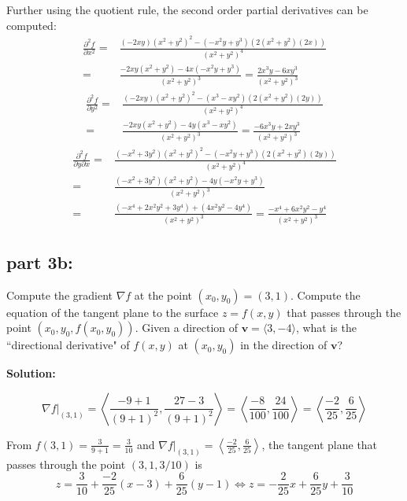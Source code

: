 \documentclass{article}
\newcommand{\at}[1]{\left. #1 \right|}
\newcommand{\dr}[1]{\textcolor{dark_red}{#1}}
\begin{document}
\dr{Further using the quotient rule, the second order partial derivatives can be computed:
\begin{align*}
\frac{\partial^2 f}{\partial x^2} = & \frac{(-2xy)(x^2 + y^2)^2 - (-x^2y + y^3)(2(x^2 + y^2)(2x))}{(x^2 + y^2)^4} \\
= & \frac{-2xy(x^2 + y^2) - 4x(-x^2y + y^3)}{(x^2 + y^2)^3}    
= \frac{2x^3y - 6xy^3}{(x^2 + y^2)^3}
\end{align*}
\begin{align*}
\frac{\partial^2 f}{\partial y^2} = & \frac{(-2xy)(x^2 + y^2)^2 - (x^3 - xy^2)(2(x^2 + y^2)(2y))}{(x^2 + y^2)^4} \\
= & \frac{-2xy(x^2 + y^2) - 4y(x^3 - xy^2)}{(x^2 + y^2)^3} 
= \frac{-6x^3y + 2xy^3}{(x^2 + y^2)^3}
\end{align*}
\begin{align*}
\frac{\partial^2 f}{\partial y \partial x} = & \frac{(-x^2 + 3y^2)(x^2 + y^2)^2 - (-x^2y + y^3)(2(x^2 + y^2)(2y))}{(x^2 + y^2)^4} \\
= & \frac{(-x^2 + 3y^2)(x^2 + y^2) - 4y(-x^2y + y^3)}{(x^2 + y^2)^3} \\
= & \frac{(-x^4 + 2x^2y^2 + 3y^4) + (4x^2y^2 - 4y^4)}{(x^2 + y^2)^3} 
= \frac{-x^4 + 6x^2y^2 - y^4}{(x^2 + y^2)^3}
\end{align*}
}

\subsection*{part 3b:}

Compute the gradient \(\nabla f\) at the point \((x_0,y_0) = (3,1)\). Compute the equation of the tangent plane to the surface \(z = f(x,y)\) that passes through the point \((x_0,y_0,f(x_0,y_0))\). Given a direction of \(\mathbf{v} = \langle 3, -4 \rangle\), what is the ``directional derivative" of \(f(x,y)\) at \((x_0, y_0)\) in the direction of \(\mathbf{v}\)?

\vspace{0.5cm}

\dr{\bf Solution:}

\vspace{0.5cm}

\dr{\[\at{\nabla f}_{(3,1)} = \left\langle \frac{-9 + 1}{(9 + 1)^2} , \frac{27 - 3}{(9 + 1)^2} \right\rangle = \left\langle \frac{-8}{100} , \frac{24}{100} \right\rangle = \left\langle \frac{-2}{25} , \frac{6}{25} \right\rangle\]}

\dr{From \(f(3,1) = \frac{3}{9 + 1} = \frac{3}{10}\) and \(\at{\nabla f}_{(3,1)} = \left\langle \frac{-2}{25} , \frac{6}{25} \right\rangle\), the tangent plane that passes through the point \((3,1,3/10)\) is 
\[z = \frac{3}{10} + \frac{-2}{25}(x - 3) + \frac{6}{25}(y - 1) \iff z = -\frac{2}{25}x + \frac{6}{25}y + \frac{3}{10}\]}
\end{document}
